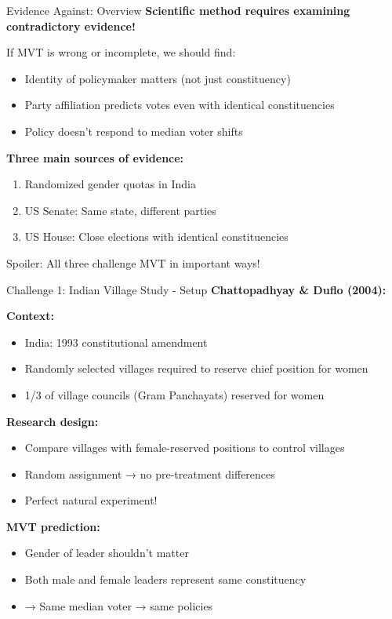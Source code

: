 \documentclass[10pt]{beamer}
\begin{document}
\begin{frame}{Evidence Against: Overview}
\textbf{Scientific method requires examining contradictory evidence!}


If MVT is wrong or incomplete, we should find:
\begin{itemize}
\item Identity of policymaker matters (not just constituency)
\item Party affiliation predicts votes even with identical constituencies
\item Policy doesn't respond to median voter shifts
\end{itemize}




\textbf{Three main sources of evidence:}
\begin{enumerate}
\item Randomized gender quotas in India
\item US Senate: Same state, different parties
\item US House: Close elections with identical constituencies
\end{enumerate}




\alert{Spoiler:} All three challenge MVT in important ways!
\end{frame}

\begin{frame}{Challenge 1: Indian Village Study - Setup}
\textbf{Chattopadhyay \& Duflo (2004):}


\textbf{Context:}
\begin{itemize}
\item India: 1993 constitutional amendment
\item Randomly selected villages required to reserve chief position for women
\item 1/3 of village councils (Gram Panchayats) reserved for women
\end{itemize}



\textbf{Research design:}
\begin{itemize}
\item Compare villages with female-reserved positions to control villages
\item Random assignment → no pre-treatment differences
\item \alert{Perfect natural experiment!}
\end{itemize}



\textbf{MVT prediction:}
\begin{itemize}
\item Gender of leader shouldn't matter
\item Both male and female leaders represent same constituency
\item → Same median voter → same policies
\end{itemize}
\end{frame}
\end{document}
